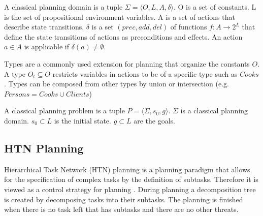 \begin{definition}
  A classical planning domain is a tuple $\Sigma=\langle O, L, A, \delta \rangle$.
  O is a set of constants.
  L is the set of propositional environment variables. 
  A is a set of actions that describe state transitions.
  $\delta$ is a set $(prec, add , del )$ of functions $f : A \rightarrow 2^L$ that define the state transitions of actions as preconditions and effects.
  An action $a \in A$ is applicable if $\delta(a) \neq \emptyset$.
\end{definition}

Types are a commonly used extension for planning that organize the constants $O$.
A type $O_t \subseteq O$ restricts variables in actions to be of a specific type such as $Cooks$.
Types can be composed from other types by union or intersection (e.g. $Persons=Cooks\cup Clients$)

\begin{definition}
  A classical planning problem is a tuple $P=\langle \Sigma, s_0, g \rangle$.
  $\Sigma$ is a classical planning domain.
  $s_0 \subset L$ is the initial state.
  $g \subset L$ are the goals.
\end{definition}

\subsection{HTN Planning}\label{sec:htn-planning}

Hierarchical Task Network (HTN) planning is a planning paradigm that allows for the specification of complex tasks by the definition of subtasks.
Therefore it is viewed as a control strategy for planning \citep[chap.~11]{ghallabAutomatedPlanningTheory2004}.
During planning a decomposition tree is created by decomposing tasks into their subtasks.
The planning is finished when there is no task left that has subtasks and there are no other threats.


